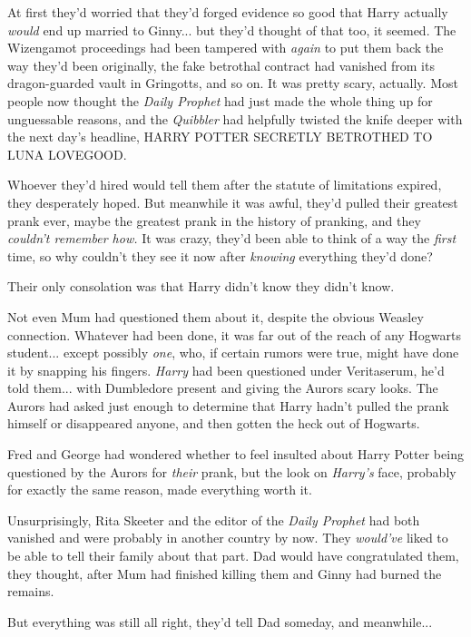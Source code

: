 At first they'd worried that they'd forged evidence so good that Harry
actually \emph{would} end up married to Ginny... but they'd thought
of that too, it seemed. The Wizengamot proceedings had been tampered
with \emph{again} to put them back the way they'd been originally, the
fake betrothal contract had vanished from its dragon-guarded vault in
Gringotts, and so on. It was pretty scary, actually. Most people now
thought the \emph{Daily Prophet} had just made the whole thing up for
unguessable reasons, and the \emph{Quibbler} had helpfully twisted the
knife deeper with the next day's headline, HARRY POTTER SECRETLY
BETROTHED TO LUNA LOVEGOOD.

Whoever they'd hired would tell them after the statute of limitations
expired, they desperately hoped. But meanwhile it was awful, they'd
pulled their greatest prank ever, maybe the greatest prank in the
history of pranking, and they \emph{couldn't remember how.} It was
crazy, they'd been able to think of a way the \emph{first} time, so why
couldn't they see it now after \emph{knowing} everything they'd done?

Their only consolation was that Harry didn't know they didn't know.

Not even Mum had questioned them about it, despite the obvious Weasley
connection. Whatever had been done, it was far out of the reach of any
Hogwarts student... except possibly \emph{one}, who, if certain
rumors were true, might have done it by snapping his fingers.
\emph{Harry} had been questioned under Veritaserum, he'd told
them... with Dumbledore present and giving the Aurors scary looks.
The Aurors had asked just enough to determine that Harry hadn't pulled
the prank himself or disappeared anyone, and then gotten the heck out of
Hogwarts.

Fred and George had wondered whether to feel insulted about Harry Potter
being questioned by the Aurors for \emph{their} prank, but the look on
\emph{Harry's} face, probably for exactly the same reason, made
everything worth it.

Unsurprisingly, Rita Skeeter and the editor of the \emph{Daily Prophet}
had both vanished and were probably in another country by now. They
\emph{would've} liked to be able to tell their family about that part.
Dad would have congratulated them, they thought, after Mum had finished
killing them and Ginny had burned the remains.

But everything was still all right, they'd tell Dad someday, and
meanwhile...

